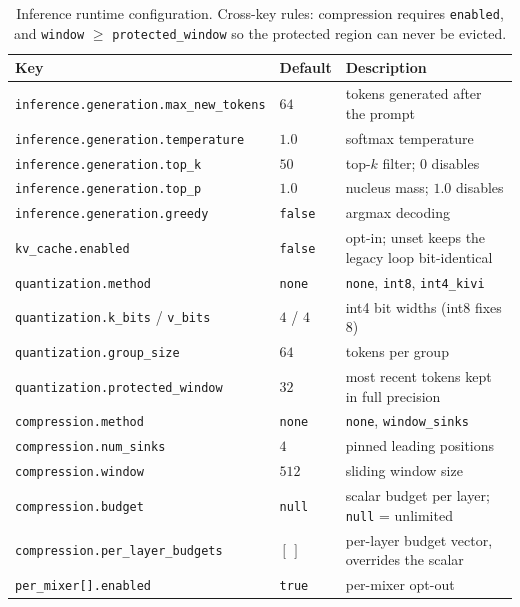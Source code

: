 \begin{table}[H]
\centering
\small
\begin{tabularx}{0.98\linewidth}{l l X}
\toprule
\textbf{Key} & \textbf{Default} & \textbf{Description} \\
\midrule
\texttt{inference.generation.max\_new\_tokens} & $64$ & tokens generated after the prompt \\
\texttt{inference.generation.temperature} & $1.0$ & softmax temperature \\
\texttt{inference.generation.top\_k} & $50$ & top-$k$ filter; $0$ disables \\
\texttt{inference.generation.top\_p} & $1.0$ & nucleus mass; $1.0$ disables \\
\texttt{inference.generation.greedy} & \texttt{false} & argmax decoding \\
\midrule
\texttt{kv\_cache.enabled} & \texttt{false} & opt-in; unset keeps the legacy loop bit-identical \\
\texttt{quantization.method} & \texttt{none} & \texttt{none}, \texttt{int8}, \texttt{int4\_kivi} \\
\texttt{quantization.k\_bits} / \texttt{v\_bits} & $4$ / $4$ & int4 bit widths (int8 fixes 8) \\
\texttt{quantization.group\_size} & $64$ & tokens per group \\
\texttt{quantization.protected\_window} & $32$ & most recent tokens kept in full precision \\
\texttt{compression.method} & \texttt{none} & \texttt{none}, \texttt{window\_sinks} \\
\texttt{compression.num\_sinks} & $4$ & pinned leading positions \\
\texttt{compression.window} & $512$ & sliding window size \\
\texttt{compression.budget} & \texttt{null} & scalar budget per layer; \texttt{null} = unlimited \\
\texttt{compression.per\_layer\_budgets} & $[\,]$ & per-layer budget vector, overrides the scalar \\
\texttt{per\_mixer[].enabled} & \texttt{true} & per-mixer opt-out \\
\bottomrule
\end{tabularx}
\caption{Inference runtime configuration. Cross-key rules: compression requires \texttt{enabled}, and \texttt{window} $\ge$ \texttt{protected\_window} so the protected region can never be evicted.}
\label{tab:kv-config}
\end{table}

